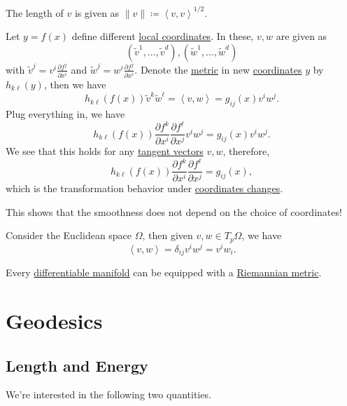\begin{remark}
	The length of \(v\) is given as \(\lVert v \rVert \coloneqq \left\langle v, v \right\rangle ^{1 / 2}\).
\end{remark}

Let \(y = f(x)\) define different \hyperref[def:coordinate-chart]{local coordinates}. In these, \(v, w\) are given as
\[
	(\widetilde{v} ^1, \ldots , \widetilde{v} ^d), (\widetilde{w} ^1, \ldots , \widetilde{w} ^d)
\]
with \(\widetilde{v} ^j = v^i \frac{\partial f^j}{\partial x^i} \) and \(\widetilde{w} ^j = w^i \frac{\partial f^j}{\partial x^i} \). Denote the \hyperref[def:Riemannian-metric]{metric} in new \hyperref[def:coordinate-chart]{coordinates} \(y\) by \(h_{k \ell }(y)\), then we have
\[
	h_{k \ell }(f(x))\widetilde{v} ^k \widetilde{w} ^\ell
	= \left\langle v, w \right\rangle
	= g_{ij}(x)v^i w^j .
\]
Plug everything in, we have
\[
	h_{k \ell }(f(x)) \frac{\partial f^k}{\partial x^i} \frac{\partial f^{\ell } }{\partial x^j} v^i w^j
	= g_{ij}(x) v^i w^j.
\]
We see that this holds for any \hyperref[def:tangent-vector]{tangent vectors} \(v, w\), therefore,
\[
	h_{k \ell }(f(x)) \frac{\partial f^k}{\partial x^i} \frac{\partial f^{\ell } }{\partial x^j} = g_{ij} (x),
\]
which is the transformation behavior under \hyperref[def:coordinate-transition]{coordinates changes}.

\begin{remark}
	This shows that the smoothness does not depend on the choice of coordinates!
\end{remark}

\begin{eg}
	Consider the Euclidean space \(\Omega \), then given \(v, w\in T_p \Omega \), we have
	\[
		\left\langle v, w \right\rangle
		= \delta _{ij} v^i w^j
		= v^i w_i.
	\]
\end{eg}

\begin{theorem}
	Every \hyperref[def:smooth-manifold]{differentiable manifold} can be equipped with a \hyperref[def:Riemannian-metric]{Riemannian metric}.
\end{theorem}

\section{Geodesics}
\subsection{Length and Energy}
We're interested in the following two quantities.

